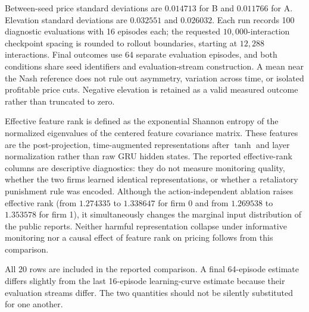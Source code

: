 Between-seed price standard deviations are $0.014713$ for B and $0.011766$ for A. Elevation standard deviations are $0.032551$ and $0.026032$. Each run records 100 diagnostic evaluations with 16 episodes each; the requested $10{,}000$-interaction checkpoint spacing is rounded to rollout boundaries, starting at $12{,}288$ interactions. Final outcomes use 64 separate evaluation episodes, and both conditions share seed identifiers and evaluation-stream construction. A mean near the Nash reference does not rule out asymmetry, variation across time, or isolated profitable price cuts. Negative elevation is retained as a valid measured outcome rather than truncated to zero.

Effective feature rank is defined as the exponential Shannon entropy of the normalized eigenvalues of the centered feature covariance matrix. These features are the post-projection, time-augmented representations after $\tanh$ and layer normalization rather than raw GRU hidden states. The reported effective-rank columns are descriptive diagnostics: they do not measure monitoring quality, whether the two firms learned identical representations, or whether a retaliatory punishment rule was encoded. Although the action-independent ablation raises effective rank (from $1.274335$ to $1.338647$ for firm 0 and from $1.269538$ to $1.353578$ for firm 1), it simultaneously changes the marginal input distribution of the public reports. Neither harmful representation collapse under informative monitoring nor a causal effect of feature rank on pricing follows from this comparison.

All 20 rows are included in the reported comparison. A final 64-episode estimate differs slightly from the last 16-episode learning-curve estimate because their evaluation streams differ. The two quantities should not be silently substituted for one another.

